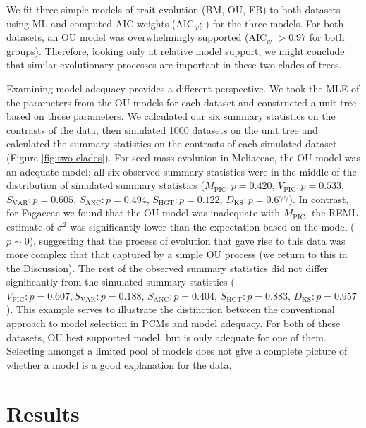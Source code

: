 \documentclass[a4paper,12pt]{article}
\begin{document}
We fit three simple models of trait evolution (BM, OU, EB) to both datasets using ML and computed AIC weights (AIC$_w$; \citep{Akaike1974, aicweight}) for the three models. For both datasets, an OU model was overwhelmingly supported (AIC$_w$ $>0.97$ for both groups). Therefore, looking only at relative model support, we might conclude that similar evolutionary processes are important in these two clades of trees.

Examining model adequacy provides a different perspective. We took the MLE of the parameters from the OU models for each dataset and constructed a unit tree based on those parameters. We calculated our six summary statistics on the contrasts of the data, then simulated 1000 datasets on the unit tree and calculated the summary statistics on the contrasts of each simulated dataset (Figure \ref{fig:two-clades}). For seed mass evolution in Meliaceae, the OU model was an adequate model; all six observed summary statistics were in the middle of the distribution of simulated summary statistics ($M_{\text{PIC}}: p=0.420$, $V_{\text{PIC}}: p=0.533$, $S_{\text{VAR}}: p=0.605$, $S_{\text{ANC}}:p=0.494$, $S_{\text{HGT}}: p=0.122$, $D_{\text{KS}}: p=0.677$). In contrast, for Fagaceae we found that the OU model was inadequate with $M_{\text{PIC}}$, the REML estimate of $\sigma^2$ was significantly lower than the expectation based on the model ($p\sim 0$), suggesting that the process of evolution that gave rise to this data was more complex that that captured by a simple OU process (we return to this in the Discussion).  The rest of the observed summary statistics did not differ significantly from the simulated summary statistics ($V_{\text{PIC}}:p=0.607, S_{\text{VAR}}: p=0.188$, $S_{\text{ANC}}:p=0.404$, $S_{\text{HGT}}: p=0.883$, $D_{\text{KS}}: p=0.957$). This example serves to illustrate the distinction between the conventional approach to model selection in PCMs and model adequacy. For both of these datasets, OU best supported model, but is only adequate for one of them. Selecting amongst a limited pool of models does not give a complete picture of whether a model is a good explanation for the data.


\section{Results}
\end{document}
